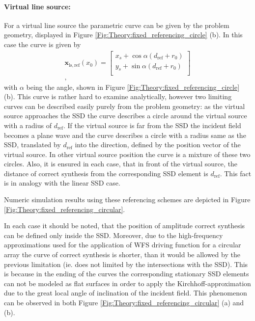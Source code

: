 \documentclass[12pt,a4paper]{article}
\newcommand{\dref}{d_{\mathrm{ref}}}
\begin{document}
\paragraph{Virtual line source:\\}
For a virtual line source the parametric curve can be given by the problem geometry, displayed in Figure \ref{Fig:Theory:fixed_referencing_circle} (b).
In this case the curve is given by
\begin{eqnarray}
\mathbf{x}_{\mathrm{ls,ref}}(x_0) =  \begin{bmatrix} x_s + \cos\alpha (\dref + r_0)\\[0.3em] y_s + \sin\alpha (\dref+r_0) \\[0.3em]    \end{bmatrix} \\,
\label{Eq:Fixed_referencing_ls_circle}
\end{eqnarray}
with $\alpha$ being the angle, shown in Figure \ref{Fig:Theory:fixed_referencing_circle} (b).
This curve is rather hard to examine analytically, however two limiting curves can be described easily purely from the problem geometry: as the virtual source approaches the SSD the curve describes a circle around the virtual source with a radius of $\dref$. If the virtual source is far from the SSD the incident field becomes a plane wave and the curve describes a circle with a radius same as the SSD, translated by $\dref$ into the direction, defined by the position vector of the virtual source. In other virtual source position the curve is a mixture of these two circles. Also, it is ensured in each case, that in front of the virtual source, the distance of correct synthesis from the corresponding SSD element is $\dref$. This fact is in analogy with the linear SSD case.

Numeric simulation results using these referencing schemes are depicted in Figure \ref{Fig:Theory:fixed_referencing_circular}.

In each case it should be noted, that the position of amplitude correct synthesis can be defined only inside the SSD. Moreover, due to the high-frequency approximations used for the application of WFS driving function for a circular array the curve of correct synthesis is shorter, than it would be allowed by the previous limitation (ie. does not limited by the intersections with the SSD). This is because in the ending of the curves the corresponding stationary SSD elements can not be modeled as flat surfaces in order to apply the Kirchhoff-approximation due to the great local angle of inclination of the incident field. This phenomenon can be observed in both Figure \ref{Fig:Theory:fixed_referencing_circular} (a) and (b).
\end{document}
